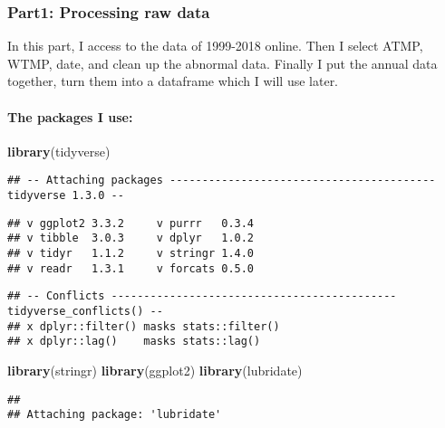 \documentclass[]{article}
\newenvironment{Shaded}{\begin{snugshade}}{\end{snugshade}}
\newcommand{\KeywordTok}[1]{\textcolor[rgb]{0.13,0.29,0.53}{\textbf{#1}}}
\newcommand{\NormalTok}[1]{#1}
\let\oldparagraph\paragraph
\renewcommand{\paragraph}[1]{\oldparagraph{#1}\mbox{}}
\begin{document}
\hypertarget{part1-processing-raw-data}{%
\subsubsection{Part1: Processing raw
data}\label{part1-processing-raw-data}}

In this part, I access to the data of 1999-2018 online. Then I select
ATMP, WTMP, date, and clean up the abnormal data. Finally I put the
annual data together, turn them into a dataframe which I will use later.

\hypertarget{the-packages-i-use}{%
\paragraph{The packages I use:}\label{the-packages-i-use}}

\begin{Shaded}
\begin{Highlighting}[]
\KeywordTok{library}\NormalTok{(tidyverse)}
\end{Highlighting}
\end{Shaded}

\begin{verbatim}
## -- Attaching packages ----------------------------------------- tidyverse 1.3.0 --
\end{verbatim}

\begin{verbatim}
## v ggplot2 3.3.2     v purrr   0.3.4
## v tibble  3.0.3     v dplyr   1.0.2
## v tidyr   1.1.2     v stringr 1.4.0
## v readr   1.3.1     v forcats 0.5.0
\end{verbatim}

\begin{verbatim}
## -- Conflicts -------------------------------------------- tidyverse_conflicts() --
## x dplyr::filter() masks stats::filter()
## x dplyr::lag()    masks stats::lag()
\end{verbatim}

\begin{Shaded}
\begin{Highlighting}[]
\KeywordTok{library}\NormalTok{(stringr)}
\KeywordTok{library}\NormalTok{(ggplot2)}
\KeywordTok{library}\NormalTok{(lubridate)}
\end{Highlighting}
\end{Shaded}

\begin{verbatim}
## 
## Attaching package: 'lubridate'
\end{verbatim}
\end{document}
